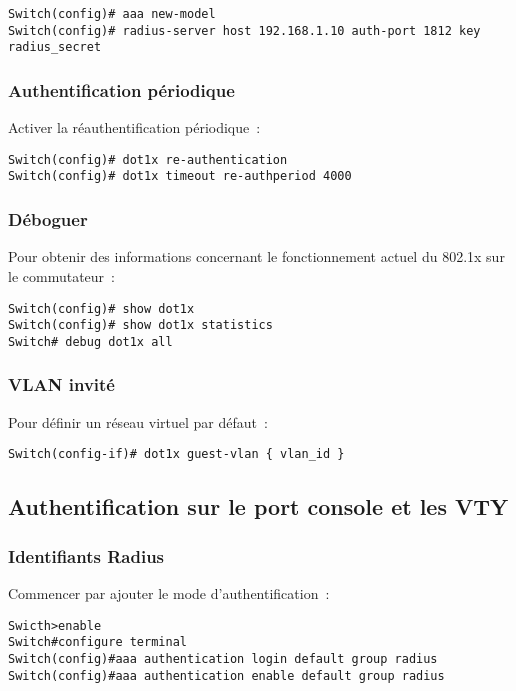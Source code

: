 \begin{lstlisting}
Switch(config)# aaa new-model
Switch(config)# radius-server host 192.168.1.10 auth-port 1812 key radius_secret
\end{lstlisting}

\subsubsection{Authentification périodique}

Activer la réauthentification périodique~:

\begin{lstlisting}
Switch(config)# dot1x re-authentication
Switch(config)# dot1x timeout re-authperiod 4000
\end{lstlisting}

\subsubsection{Déboguer}

Pour obtenir des informations concernant le fonctionnement actuel du 802.1x sur le commutateur~:

\begin{lstlisting}
Switch(config)# show dot1x
Switch(config)# show dot1x statistics
Switch# debug dot1x all
\end{lstlisting}

\subsubsection{VLAN invité}

Pour définir un réseau virtuel par défaut~:

\begin{lstlisting}
Switch(config-if)# dot1x guest-vlan { vlan_id }
\end{lstlisting}

\subsection{Authentification sur le port console et les VTY}
\subsubsection{Identifiants Radius}

Commencer par ajouter le mode d'authentification~:

\begin{lstlisting}
Swicth>enable
Switch#configure terminal
Switch(config)#aaa authentication login default group radius
Switch(config)#aaa authentication enable default group radius
\end{lstlisting}

